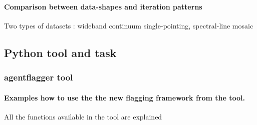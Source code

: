 \paragraph{Comparison between data-shapes and iteration patterns}

Two types of datasets : wideband continuum single-pointing,   spectral-line mosaic






\subsection{Python tool and task}\label{Sec:TaskTool}

\subsubsection{agentflagger tool}
\paragraph{Examples how to use the the new flagging framework from the tool.}
All the functions available in the tool are explained

